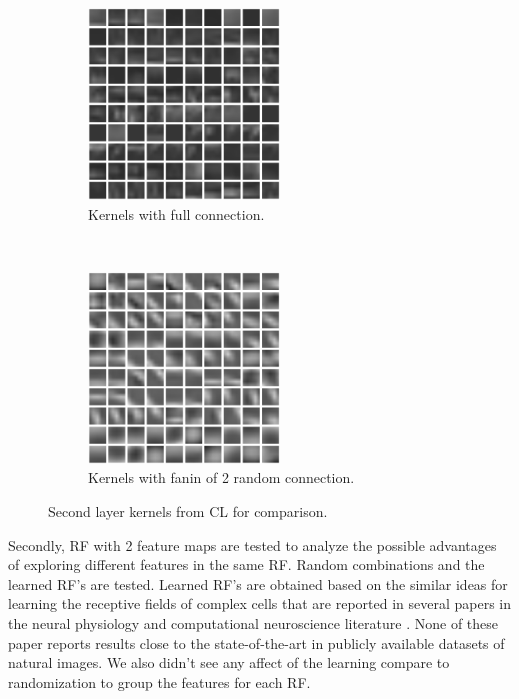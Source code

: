 \documentclass{article} %
\begin{document}
\begin{figure}
        \centering
        \label{fig-secondkernels}
        \begin{subfigure}[b]{0.5\textwidth}
                \centering
                \includegraphics[width=2.0in]{fig-kernels2-full.eps}
                \caption{Kernels with full connection.}
        \end{subfigure}%
        ~%
        \begin{subfigure}[b]{0.5\textwidth}
                \centering
                \includegraphics[width=2.0in]{fig-kernels2-random.eps}
                \caption{Kernels with fanin of 2 random connection.}
        \end{subfigure}
        \caption{Second layer kernels from CL for comparison.}
\end{figure}




Secondly, RF with 2 feature maps are tested to analyze the possible advantages of exploring different features in the same RF. Random combinations and the learned RF's are tested. Learned RF's are obtained  based on the similar ideas for learning the receptive fields of complex cells that are reported in  several papers in the neural physiology and computational neuroscience literature  \cite{masquelier2007learning,spratling2005learning,wiskott2002slow,wallis1997invariant}. None of these paper reports results close to the state-of-the-art in publicly available datasets of natural images. We also didn't see any affect of the learning compare to randomization to group the features for each RF.
\end{document}
